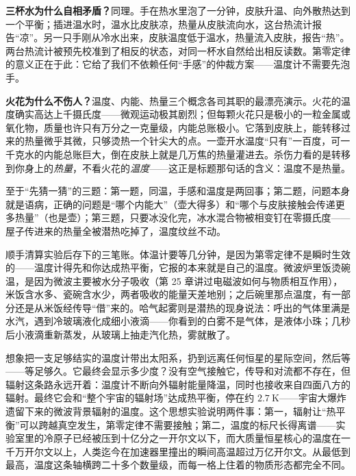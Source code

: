 \textbf{三杯水为什么自相矛盾？}同理。手在热水里泡了一分钟，皮肤升温、向外散热达到一个平衡；插进温水时，温水比皮肤凉，热量从皮肤流向水，这台热流计报告“凉”。另一只手刚从冷水出来，皮肤温度低于温水，热量流入皮肤，报告“热”。两台热流计被预先校准到了相反的状态，对同一杯水自然给出相反读数。第零定律的意义正在于此：它给了我们不依赖任何“手感”的仲裁方案——温度计不需要先泡手。

\textbf{火花为什么不伤人？}温度、内能、热量三个概念各司其职的最漂亮演示。火花的温度确实高达上千摄氏度——微观运动极其剧烈；但每颗火花只是极小的一粒金属或氧化物，质量也许只有万分之一克量级，内能总账极小。它落到皮肤上，能转移过来的热量微乎其微，只够烫热一个针尖大的点。一壶开水温度“只有”一百度，可一千克水的内能总账巨大，倒在皮肤上就是几万焦的热量灌进去。杀伤力看的是转移到你身上的\emph{热量}，不看火花的\emph{温度}——这正是标题那句话的含义：温度不是热量。

至于“先猜一猜”的三题：第一题，同温，手感和温度是两回事；第二题，问题本身就是语病，正确的问题是“哪个内能大”（壶大得多）和“哪个与皮肤接触会传递更多热量”（也是壶）；第三题，只要冰没化完，冰水混合物被相变钉在零摄氏度——屋子传进来的热量全被潜热吃掉了，温度纹丝不动。

顺手清算实验后存下的三笔账。体温计要等几分钟，是因为第零定律不是瞬时生效的——温度计得先和你达成热平衡，它报的本来就是自己的温度。微波炉里饭烫碗温，是因为微波主要被水分子吸收（第 25 章讲过电磁波如何与物质相互作用），米饭含水多、瓷碗含水少，两者吸收的能量天差地别；之后碗里那点温度，有一部分还是从米饭经传导“借”来的。哈气起雾则是潜热的现身说法：呼出的气体里满是水汽，遇到冷玻璃液化成细小液滴——你看到的白雾不是气体，是液体小珠；几秒后小液滴重新蒸发，从玻璃上抽走汽化热，雾就散了。


\begin{thought}[把一支温度计扔到深空]
想象把一支足够结实的温度计带出太阳系，扔到远离任何恒星的星际空间，然后等——等足够久。它最终会显示多少度？没有空气接触它，传导和对流都不存在，但辐射这条路永远开着：温度计不断向外辐射能量降温，同时也接收来自四面八方的辐射。最终它会和“整个宇宙的辐射场”达成热平衡，停在约 \(2.7\ \mathrm{K}\)——宇宙大爆炸遗留下来的微波背景辐射的温度。这个思想实验说明两件事：第一，辐射让“热平衡”可以跨越真空发生，第零定律不需要接触；第二，温度的标尺长得离谱——实验室里的冷原子已经被压到十亿分之一开尔文以下，而大质量恒星核心的温度在一千万开尔文以上，人类迄今在加速器里撞出的瞬间高温超过万亿开尔文。从最低到最高，温度这条轴横跨二十多个数量级，而每一格上住着的物质形态都完全不同。
\end{thought}

